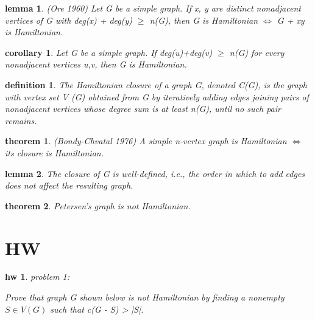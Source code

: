 \documentclass[twocolumn]{article}
\newtheorem{theorem}{theorem}[section]  %
\newtheorem{definition}{definition}
\newtheorem{lemma}{lemma}
\newtheorem{corollary}{corollary}
\newtheorem{hw}{hw}
\begin{document}
\begin{CJK*}{UTF8}{bkai}
    \begin{lemma}{(Ore 1960)}
        Let G be a simple graph. If x, y are distinct nonadjacent vertices of G with 
deg(x) + deg(y) $\geq$ n(G), then G is Hamiltonian $\iff$ G + xy is Hamiltonian.

    \end{lemma}

    \begin{corollary}
         Let G be a simple graph. If deg(u)+deg(v) $\geq$ n(G) for every nonadjacent
 vertices u,v, then G is Hamiltonian.
    \end{corollary}

    \begin{definition}
        The Hamiltonian closure of a graph G, denoted C(G), is the graph with vertex
 set V (G) obtained from G by iteratively adding edges joining pairs of
 nonadjacent vertices whose degree sum is at least n(G), until no such pair
 remains.
    \end{definition}

    \begin{theorem}{(Bondy-Chvatal 1976)}
         A simple n-vertex graph is Hamiltonian $\iff$ its closure is Hamiltonian.
    \end{theorem}

    \begin{lemma}
        The closure of G is well-defined, i.e., the order in which to add edges does not
 affect the resulting graph.
    \end{lemma}

    \begin{theorem}
        Petersen's graph is not Hamiltonian.
    \end{theorem}

\section{HW} 
\begin{hw}
problem 1:

Prove that graph G shown below is not Hamiltonian by finding 
a nonempty $S \in V(G)$ such that c(G - S) > |S|.


\end{hw}
\end{CJK*}
\end{document}
